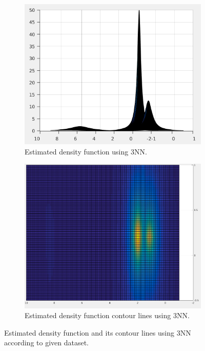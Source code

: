 \documentclass[12pt]{article}
\begin{document}
\begin{itemize}
\begin{figure}[h]
\centering
\begin{subfigure}{.4\textwidth}
\centering
\includegraphics[scale=0.35]{Imgs/2-3.png}
\caption{Estimated density function using 3NN.}
\end{subfigure}
\begin{subfigure}{.4\textwidth}
\centering
\includegraphics[scale=0.2]{Imgs/2-4.png}
\caption{Estimated density function contour lines using 3NN.}
\end{subfigure}
\caption{Estimated density function and its contour lines using 3NN according to given dataset.}
\label{fig:2-3}
\end{figure}
\end{itemize}
\end{document}
